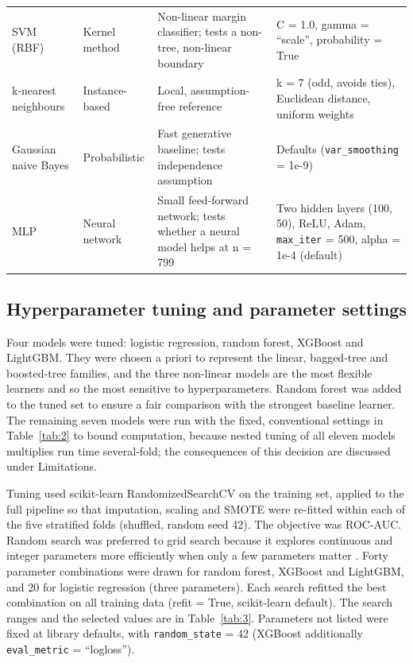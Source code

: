 \documentclass[a4paper,fleqn]{cas-dc}
\begin{document}
\begin{table}[tbp]
{\begin{tabular}{>{\raggedright\arraybackslash}p{}>{\raggedright\arraybackslash}p{}>{\raggedright\arraybackslash}p{}>{\raggedright\arraybackslash}p{}}
SVM (RBF) & Kernel method & Non-linear margin classifier; tests a non-tree, non-linear boundary & C = 1.0, gamma = “scale”, probability = True \\
k-nearest neighbours & Instance-based & Local, assumption-free reference & k = 7 (odd, avoids ties), Euclidean distance, uniform weights \\
Gaussian naive Bayes & Probabilistic & Fast generative baseline; tests independence assumption & Defaults (\texttt{var\_\allowbreak smoothing} = 1e-9) \\
MLP & Neural network & Small feed-forward network; tests whether a neural model helps at n = 799 & Two hidden layers (100, 50), ReLU, Adam, \texttt{max\_\allowbreak iter} = 500, alpha = 1e-4 (default) \\
\bottomrule
\end{tabular}}
\end{table}

\subsection{Hyperparameter tuning and parameter settings}
\label{sec:hyp}

Four models were tuned: logistic regression, random forest, XGBoost and LightGBM. They were chosen a priori to represent the linear, bagged-tree and boosted-tree families, and the three non-linear models are the most flexible learners and so the most sensitive to hyperparameters. Random forest was added to the tuned set to ensure a fair comparison with the strongest baseline learner. The remaining seven models were run with the fixed, conventional settings in Table~\ref{tab:2} to bound computation, because nested tuning of all eleven models multiplies run time several-fold; the consequences of this decision are discussed under Limitations.

Tuning used scikit-learn RandomizedSearchCV on the training set, applied to the full pipeline so that imputation, scaling and SMOTE were re-fitted within each of the five stratified folds (shuffled, random seed 42). The objective was ROC-AUC. Random search was preferred to grid search because it explores continuous and integer parameters more efficiently when only a few parameters matter \cite{r21}. Forty parameter combinations were drawn for random forest, XGBoost and LightGBM, and 20 for logistic regression (three parameters). Each search refitted the best combination on all training data (refit = True, scikit-learn default). The search ranges and the selected values are in Table~\ref{tab:3}. Parameters not listed were fixed at library defaults, with \texttt{random\_\allowbreak state} = 42 (XGBoost additionally \texttt{eval\_\allowbreak metric} = “logloss”).
\end{document}
